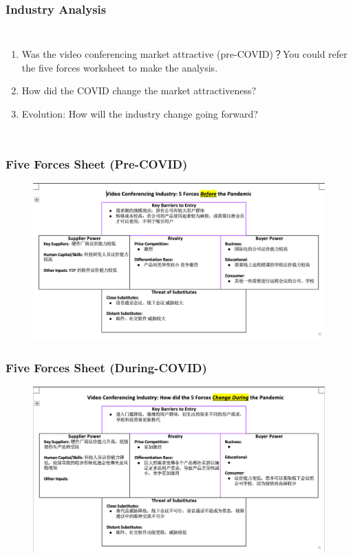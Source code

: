 \documentclass{beamer}
\begin{document}
\begin{frame}
\frametitle{Industry Analysis}
\begin{columns}[c]  %


\begin{enumerate}
    \item Was the video conferencing market attractive (pre-COVID)？You could refer the five forces worksheet to make the analysis.
    \item How did the COVID change the market attractiveness?
    \item Evolution: How will the industry change going forward?
\end{enumerate}


\end{columns}
\end{frame}

\begin{frame}
\frametitle{Five Forces Sheet (Pre-COVID)}
\begin{figure}[h]
    \includegraphics[width=12cm]{pics/before.png}
\end{figure}
\end{frame}

\begin{frame}
\frametitle{Five Forces Sheet (During-COVID)}
\begin{figure}[h]
    \includegraphics[width=12cm]{pics/during.png}
\end{figure}
\end{frame}
\end{document}
